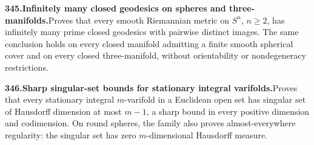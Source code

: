 \documentclass[11pt,a4paper]{article}
\begin{document}
  \par \begin{minipage}{\linewidth}
  \fontsize{10.5}{12.6}\selectfont\RaggedRight
  \hypertarget{result 345}{}
  {\bfseries\textcolor{muted}{345.}\enspace Infinitely many closed geodesics on spheres and three-manifolds.}\enspace Proves that every smooth Riemannian metric on $S^n$, $n\ge2$, has infinitely many prime closed geodesics with pairwise distinct images. The same conclusion holds on every closed manifold admitting a finite smooth spherical cover and on every closed three-manifold, without orientability or nondegeneracy restrictions.\par
  \end{minipage}\par\vspace{5pt}



  \par \begin{minipage}{\linewidth}
  \fontsize{10.5}{12.6}\selectfont\RaggedRight
  \hypertarget{result 346}{}
  {\bfseries\textcolor{muted}{346.}\enspace Sharp singular-set bounds for stationary integral varifolds.}\enspace Proves that every stationary integral $m$-varifold in a Euclidean open set has singular set of Hausdorff dimension at most $m-1$, a sharp bound in every positive dimension and codimension. On round spheres, the family also proves almost-everywhere regularity: the singular set has zero $m$-dimensional Hausdorff measure.\par
  \end{minipage}\par\vspace{5pt}
\end{document}
